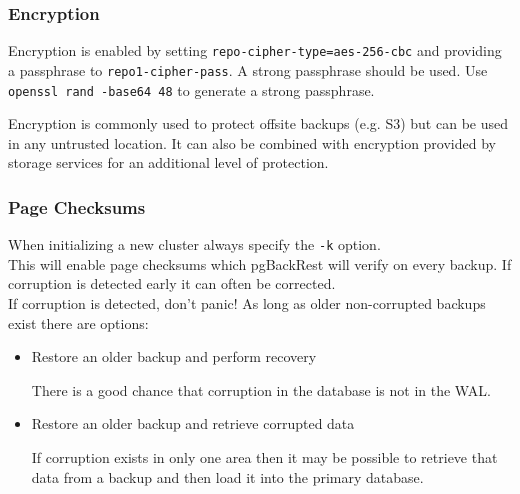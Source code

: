 \begin{frame}[fragile]
    \frametitle{Encryption}

    Encryption is enabled by setting \texttt{repo-cipher-type=aes-256-cbc} and providing a passphrase to \texttt{repo1-cipher-pass}. A strong passphrase should be used. Use \texttt{openssl rand -base64 48} to generate a strong passphrase.
    \\\vspace{1em}

    Encryption is commonly used to protect offsite backups (e.g. S3) but can be used in any untrusted location. It can also be combined with encryption provided by storage services for an additional level of protection.
\end{frame}

\begin{frame}[fragile]
    \frametitle{Page Checksums}

    When initializing a new cluster always specify the \texttt{-k} option.
    \\\vspace{1em}
    This will enable page checksums which pgBackRest will verify on every backup. If corruption is detected early it can often be corrected.
    \\\vspace{1em}
    If corruption is detected, don't panic! As long as older non-corrupted backups exist there are options:

    \begin{itemize}
        \item Restore an older backup and perform recovery

        There is a good chance that corruption in the database is not in the WAL.

        \item Restore an older backup and retrieve corrupted data

        If corruption exists in only one area then it may be possible to retrieve that data from a backup and then load it into the primary database.
    \end{itemize}
\end{frame}


